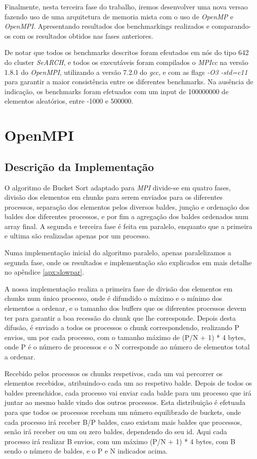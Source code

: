 \documentclass[a4paper]{report}
\begin{document}
Finalmente, nesta terceira fase do trabalho, iremos desenvolver uma nova versao
fazendo uso de uma arquitetura de memoria mista com o uso de \textit{OpenMP}
e \textit{OpenMPI}. Apresentando resultados dos benchmarkings realizados e
comparando-os com os resultados obtidos nas fases anteriores.

De notar que todos os benchmarks descritos foram efeutados em nós do tipo 642 do
cluster \textit{SeARCH}, e todos os executáveis foram compilados o
\textit{MPIcc} na versão 1.8.1 do \textit{OpenMPI}, utilizando a versão
7.2.0 do \textit{gcc}, e com as flags \textit{-O3 -std=c11} para garantir
a maior consistência entre os diferentes benchmarks. Na
ausência de indicação, os benchmarks foram efetuados com um input de 100000000
de elementos aleatórios, entre -1000 e 500000.


\chapter{OpenMPI} \label{chap:ompi}

\section{Descrição da Implementação}
O algoritmo de Bucket Sort adaptado para \textit{MPI} divide-se em quatro fases,
divisão dos elementos em chunks para serem enviados para os diferentes
processos, separação dos elementos pelos diversos baldes, junção e ordenação dos
baldes dos diferentes processos, e por fim a agregação dos baldes ordenados num
array final. A segunda e terceira fase é feita em paralelo, enquanto que a
primeira e ultima são realizadas apenas por um processo.

Numa implementação inicial do algoritmo paralelo, apenas paralelizamos a
segunda fase, onde os resultados e implementação são explicados em mais detalhe
no apêndice \ref{apx:slowpar}.

A nossa implementação realiza a primeira fase de divisão dos elementos em chunks
num único processo, onde é difundido o máximo e o mínimo dos elementos a
ordenar, e o tamanho dos buffers que os diferentes processos devem ter para
garantir a boa recessão do chunk que lhe corresponde. Depois desta difusão, é
enviado a todos os processos o chunk correspondendo, realizando P envios, um por
cada processo, com o tamanho máximo de (P/N + 1) * 4 bytes, onde P é o número de
processos e o N corresponde ao número de elementos total a ordenar.

Recebido pelos processos os chunks respetivos, cada um vai percorrer os
elementos recebidos, atribuindo-o cada um ao respetivo balde. Depois de todos os
baldes preenchidos, cada processo vai enviar cada balde para um processo que
irá juntar ao mesmo balde vindo dos outros processos. Esta distribuição é
efetuada para que todos os processos recebam um número equilibrado de
buckets, onde cada processo irá receber B/P baldes, caso existam mais baldes
que processos, senão irá receber ou um ou zero baldes, dependendo do seu id.
Aqui cada processo irá realizar B envios, com um máximo (P/N + 1) * 4 bytes,
com B sendo o número de baldes, e o P e N indicados acima.
\end{document}
